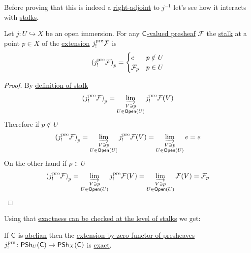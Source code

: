 \documentclass[../../main]{subfiles}
\begin{document}
Before proving that this is indeed a \hyperref[def:adjoint-functors]{right-adjoint} to \(j^{-1}\) let's see how it interacts with \hyperref[def:stalk]{stalks}.
\begin{lemma}\label{lemma:stalk-extension-by-zero-presheaf}
  Let \(j\colon U \hookrightarrow X\) be an open immersion.
  For any \hyperref[def:presheaf]{\(\mathsf{C}\)-valued presheaf} \(\mathcal{F}\) the \hyperref[def:stalk]{stalk} at a point \(p \in X\) of the \hyperref[def:extension-by-zero-presheaf]{extension} \(j_{!}^{\operatorname*{pre}}\mathcal{F}\) is
  \begin{equation*}
    \left( j_{!}^{\operatorname*{pre}}\mathcal{F} \right)_{p} = \begin{cases}
      e & p \notin U \\
      \mathcal{F}_{p} & p \in U
    \end{cases}
  \end{equation*}
\end{lemma}
\begin{proof}
  By \hyperref[def:stalk]{definition of stalk}
  \begin{equation*}
    \left( j_{!}^{\operatorname*{pre}}\mathcal{F} \right)_{p} = \varinjlim_{\substack{V \ni p \\ U \in \mathsf{Open}(U)}} j_{!}^{\operatorname*{pre}}\mathcal{F}(V)
  \end{equation*}
  Therefore if \(p \notin U\)
  \begin{equation*}
    \left( j_{!}^{\operatorname*{pre}}\mathcal{F} \right)_{p} = \varinjlim_{\substack{V \ni p \\ U \in \mathsf{Open}(U)}} j_{!}^{\operatorname*{pre}}\mathcal{F}(V) = \varinjlim_{\substack{V \ni p \\ U \in \mathsf{Open}(U)}} e = e
  \end{equation*}
  On the other hand if \(p \in U\)
  \begin{equation*}
    \left( j_{!}^{\operatorname*{pre}}\mathcal{F} \right)_{p} = \varinjlim_{\substack{V \ni p \\ U \in \mathsf{Open}(U)}} j_{!}^{\operatorname*{pre}}\mathcal{F}(V) = \varinjlim_{\substack{V \ni p \\ U \in \mathsf{Open}(U)}} \mathcal{F}(V) = \mathcal{F}_{p} \qedhere
  \end{equation*}
\end{proof}

Using that \hyperref[cor:exactness-at-stalks]{exactness can be checked at the level of stalks} we get:
\begin{corollary}\label{cor:extension-by-zero-presheaf-exact}
  If \(\mathsf{C}\) is \hyperref[def:abelian-category]{abelian} then the \hyperref[def:extension-by-zero-presheaf]{extension by zero functor of presheaves} \(j_{!}^{\operatorname*{pre}}\colon \mathsf{PSh}_{U}(\mathsf{C}) \to \mathsf{PSh}_{X}(\mathsf{C})\) is \hyperref[def:exact-functor]{exact}.
\end{corollary}
\end{document}
